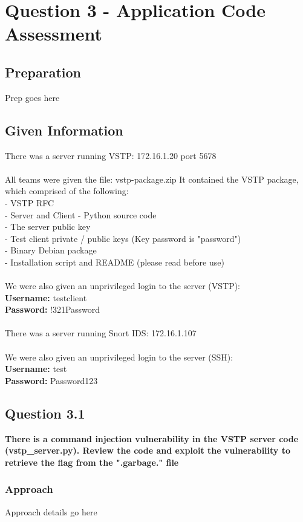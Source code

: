 \chapter{Question 3 - Application Code Assessment}

\section{Preparation}
Prep goes here

\section{Given Information}
There was a server running VSTP: 172.16.1.20 port 5678
\\\\
All teams were given the file: vstp-package.zip
It contained the VSTP package, which comprised of the following:
\\- VSTP RFC
\\- Server and Client - Python source code
\\- The server public key
\\- Test client private / public keys (Key password is "password")
\\- Binary Debian package
\\- Installation script and README (please read before use)
\\\\
We were also given an unprivileged login to the server (VSTP):\\
\textbf{Username:} testclient
\\
\textbf{Password:} !321Password
\\\\
There was a server running Snort IDS: 172.16.1.107
\\\\
We were also given an unprivileged login to the server (SSH):\\
\textbf{Username:} test
\\
\textbf{Password:} Password123

\section{Question 3.1}
\textbf{There is a command injection vulnerability in the VSTP server code
(vstp\_server.py). Review the code and exploit the vulnerability to retrieve the
flag from the ".garbage." file}
\subsection{Approach}
Approach details go here
